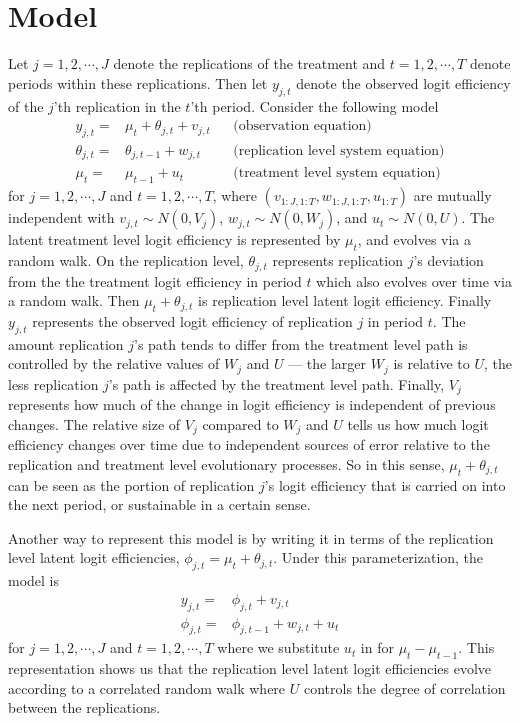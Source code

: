 \documentclass[graybox]{svmult}
\begin{document}
\section{Model}\label{sec:model}
Let $j=1,2,\cdots,J$ denote the replications of the treatment and $t=1,2,\cdots,T$ denote periods within these replications. Then let $y_{j,t}$ denote the observed logit efficiency of the $j$'th replication in the $t$'th period. Consider the following model
\begin{align}
y_{j,t} =& \mu_t + \theta_{j,t} + v_{j,t}&&\mbox{(observation equation)} \nonumber\\
\theta_{j,t}=&\theta_{j,t-1} + w_{j,t}&&\mbox{(replication level system equation)}\nonumber\\
\mu_t=&\mu_{t-1} + u_t&&\mbox{(treatment level system equation)}\label{eq:hier}
\end{align}
for $j=1,2,\cdots,J$ and $t=1,2,\cdots,T$, where $(v_{1:J,1:T},w_{1:J,1:T},u_{1:T})$ are mutually independent with $v_{j,t}\sim N(0,V_j)$, $w_{j,t}\sim N(0,W_j)$, and $u_t\sim N(0,U)$. The latent treatment level logit efficiency is represented by $\mu_{t}$, and evolves via a random walk. On the replication level, $\theta_{j,t}$ represents replication $j$'s deviation from the the treatment logit efficiency in period $t$ which also evolves over time via a random walk. Then $\mu_t + \theta_{j,t}$ is replication level latent logit efficiency. Finally $y_{j,t}$ represents the observed logit efficiency of replication $j$ in period $t$. The amount replication $j$'s path tends to differ from the treatment level path is controlled by the relative values of $W_j$ and $U$ --- the larger $W_j$ is relative to $U$, the less replication $j$'s path is affected by the treatment level path. Finally, $V_j$ represents how much of the change in logit efficiency is independent of previous changes. The relative size of $V_{j}$ compared to $W_j$ and $U$ tells us how much logit efficiency changes over time due to independent sources of error relative to the replication and treatment level evolutionary processes. So in this sense, $\mu_t + \theta_{j,t}$ can be seen as the portion of replication $j$'s logit efficiency that is carried on into the next period, or sustainable in a certain sense.

Another way to represent this model is by writing it in terms of the replication level latent logit efficiencies, $\phi_{j,t}=\mu_t + \theta_{j,t}$. Under this parameterization, the model is
\begin{align}
y_{j,t} =& \phi_{j,t} + v_{j,t}\nonumber\\
\phi_{j,t}=&\phi_{j,t-1} + w_{j,t} + u_t \label{eq:notrt}
\end{align}
for $j=1,2,\cdots,J$ and $t=1,2,\cdots,T$ where we substitute $u_t$ in for $\mu_t - \mu_{t-1}$. This representation shows us that the replication level latent logit efficiencies evolve according to a correlated random walk where $U$ controls the degree of correlation between the replications. 
\end{document}

